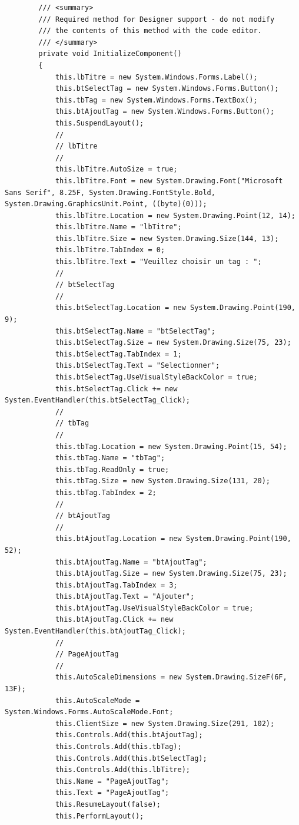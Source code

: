 \documentclass[main.tex]{subfiles}
\begin{document}
\begin{lstlisting}
        /// <summary>
        /// Required method for Designer support - do not modify
        /// the contents of this method with the code editor.
        /// </summary>
        private void InitializeComponent()
        {
            this.lbTitre = new System.Windows.Forms.Label();
            this.btSelectTag = new System.Windows.Forms.Button();
            this.tbTag = new System.Windows.Forms.TextBox();
            this.btAjoutTag = new System.Windows.Forms.Button();
            this.SuspendLayout();
            // 
            // lbTitre
            // 
            this.lbTitre.AutoSize = true;
            this.lbTitre.Font = new System.Drawing.Font("Microsoft Sans Serif", 8.25F, System.Drawing.FontStyle.Bold, System.Drawing.GraphicsUnit.Point, ((byte)(0)));
            this.lbTitre.Location = new System.Drawing.Point(12, 14);
            this.lbTitre.Name = "lbTitre";
            this.lbTitre.Size = new System.Drawing.Size(144, 13);
            this.lbTitre.TabIndex = 0;
            this.lbTitre.Text = "Veuillez choisir un tag : ";
            // 
            // btSelectTag
            // 
            this.btSelectTag.Location = new System.Drawing.Point(190, 9);
            this.btSelectTag.Name = "btSelectTag";
            this.btSelectTag.Size = new System.Drawing.Size(75, 23);
            this.btSelectTag.TabIndex = 1;
            this.btSelectTag.Text = "Selectionner";
            this.btSelectTag.UseVisualStyleBackColor = true;
            this.btSelectTag.Click += new System.EventHandler(this.btSelectTag_Click);
            // 
            // tbTag
            // 
            this.tbTag.Location = new System.Drawing.Point(15, 54);
            this.tbTag.Name = "tbTag";
            this.tbTag.ReadOnly = true;
            this.tbTag.Size = new System.Drawing.Size(131, 20);
            this.tbTag.TabIndex = 2;
            // 
            // btAjoutTag
            // 
            this.btAjoutTag.Location = new System.Drawing.Point(190, 52);
            this.btAjoutTag.Name = "btAjoutTag";
            this.btAjoutTag.Size = new System.Drawing.Size(75, 23);
            this.btAjoutTag.TabIndex = 3;
            this.btAjoutTag.Text = "Ajouter";
            this.btAjoutTag.UseVisualStyleBackColor = true;
            this.btAjoutTag.Click += new System.EventHandler(this.btAjoutTag_Click);
            // 
            // PageAjoutTag
            // 
            this.AutoScaleDimensions = new System.Drawing.SizeF(6F, 13F);
            this.AutoScaleMode = System.Windows.Forms.AutoScaleMode.Font;
            this.ClientSize = new System.Drawing.Size(291, 102);
            this.Controls.Add(this.btAjoutTag);
            this.Controls.Add(this.tbTag);
            this.Controls.Add(this.btSelectTag);
            this.Controls.Add(this.lbTitre);
            this.Name = "PageAjoutTag";
            this.Text = "PageAjoutTag";
            this.ResumeLayout(false);
            this.PerformLayout();


\end{lstlisting}
\end{document}
